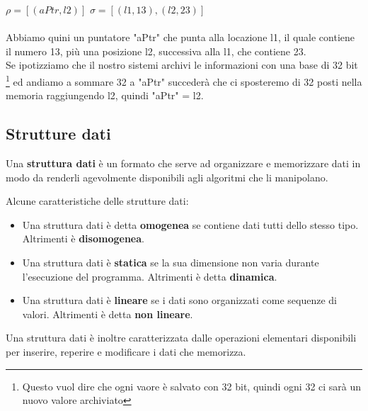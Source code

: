 $\rho = [(aPtr, l2)]$ \: \: $\sigma = [(l1,13), (l2,23)]$\\ \\
Abbiamo quini un puntatore "aPtr" che punta alla locazione l1, il quale contiene il numero 13, più una posizione l2, successiva alla l1, che contiene 23.\\ Se ipotizziamo che il nostro sistemi archivi le informazioni con una base di 32 bit \footnote{Questo vuol dire che ogni vaore è salvato con 32 bit, quindi ogni 32 ci sarà un nuovo valore archiviato} ed andiamo a sommare 32 a "aPtr" succederà che ci sposteremo di 32 posti nella memoria raggiungendo l2, quindi "aPtr" = l2.

\subsection{Strutture dati}
\begin{definition}
Una \textbf{struttura dati} è un formato che serve ad organizzare e memorizzare dati in modo da renderli agevolmente disponibili agli algoritmi che li manipolano.
\end{definition}
\hspace{-15pt}Alcune caratteristiche delle strutture dati:
\begin{itemize}
    \item Una struttura dati è detta \textbf{omogenea} se contiene dati tutti dello stesso tipo. Altrimenti è \textbf{disomogenea}.
    \item Una struttura dati è \textbf{statica} se la sua dimensione non varia durante l'esecuzione del programma. Altrimenti è detta \textbf{dinamica}.
    \item Una struttura dati è \textbf{lineare} se i dati sono organizzati come sequenze di valori. Altrimenti è detta \textbf{non lineare}.
\end{itemize}
Una struttura dati è inoltre caratterizzata dalle operazioni elementari disponibili per inserire, reperire e modificare i dati che memorizza.
